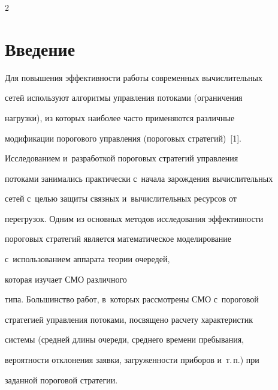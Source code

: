 \begin{multicols}{2}





\label{st\stat}





\section{Введение}





\vspace*{-3pt}











Для повышения эффективности работы современных вычислительных


сетей используют алгоритмы управления потоками (ограничения


на\-грузки), из которых наиболее часто применяются различные


модификации порогового управления (пороговых стратегий)~[1].


Исследованием и~разработкой пороговых стратегий управления


потоками занимались практически с~начала зарождения вычислительных


сетей с~целью защиты связных и~вычислительных ресурсов от


перегрузок. Одним из основных методов исследования эф\-фек\-тив\-ности


пороговых стратегий  является математическое моделирование 


с~использованием аппарата теории очередей,


которая изучает СМО различного


типа. Большинство работ, в~которых рассмотрены СМО с~пороговой


стратегией управления потоками, посвящено расчету характеристик


системы (средней длины очереди, среднего времени пребывания,


вероятности отклонения заявки, загруженности приборов и~т.\,п.) при


заданной пороговой стратегии. 






\end{multicols}
